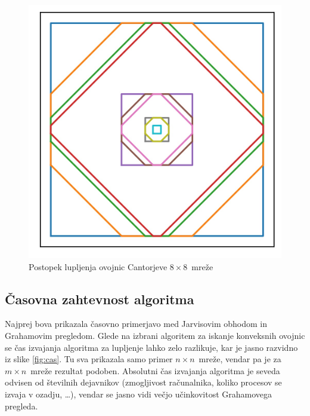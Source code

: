 \documentclass[a4paper]{article}
\begin{document}
\begin{figure}[!h]
	\centering
	\caption{Postopek lupljenja ovojnic Cantorjeve $8 \times 8$~mreže}
	\label{fig:cantor}
	\includegraphics[scale=0.8]{slike/kvazi_cantor.jpg}
\end{figure}
\pagebreak
\subsection{Časovna zahtevnost algoritma}
Najprej bova prikazala časovno primerjavo med Jarvisovim obhodom in Grahamovim pregledom. Glede na izbrani algoritem za iskanje konveksnih ovojnic se čas izvajanja algoritma za lupljenje
lahko zelo razlikuje, kar je jasno razvidno iz slike \ref{fig:cas}. Tu sva prikazala samo primer $n \times n$~mreže, vendar pa je za $m \times n$~mreže rezultat podoben. Absolutni
čas izvajanja algoritma je seveda odvisen od številnih dejavnikov (zmogljivost računalnika, koliko procesov se izvaja v ozadju, \ldots), vendar se jasno vidi
večjo učinkovitost Grahamovega pregleda.
\end{document}
